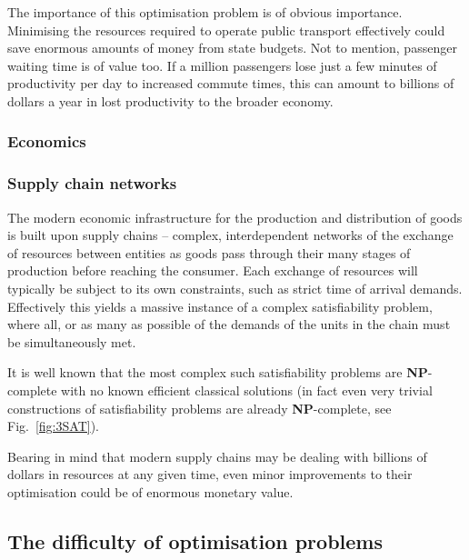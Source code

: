 The importance of this optimisation problem is of obvious importance. Minimising the resources required to operate public transport effectively could save enormous amounts of money from state budgets. Not to mention, passenger waiting time is of value too. If a million passengers lose just a few minutes of productivity per day to increased commute times, this can amount to billions of dollars a year in lost productivity to the broader economy.


\subsubsection{Economics}


\subsubsection{Supply chain networks}

The modern economic infrastructure for the production and distribution of goods is built upon supply chains -- complex, interdependent networks of the exchange of resources between entities as goods pass through their many stages of production before reaching the consumer. Each exchange of resources will typically be subject to its own constraints, such as strict time of arrival demands. Effectively this yields a massive instance of a complex satisfiability problem, where all, or as many as possible of the demands of the units in the chain must be simultaneously met.

It is well known that the most complex such satisfiability problems are \textbf{NP}-complete with no known efficient classical solutions (in fact even very trivial constructions of satisfiability problems are already \textbf{NP}-complete, see Fig.~\ref{fig:3SAT}).

Bearing in mind that modern supply chains may be dealing with billions of dollars in resources at any given time, even minor improvements to their optimisation could be of enormous monetary value. 


\subsection{The difficulty of optimisation problems}

